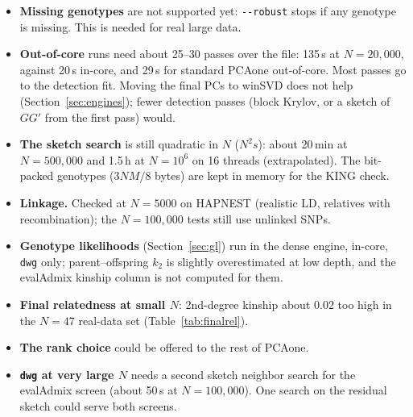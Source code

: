 \documentclass[11pt,a4paper]{article}
\newcommand{\opt}[1]{\texttt{-{}-#1}}
\begin{document}
\begin{itemize}
  \item \textbf{Missing genotypes} are not supported yet: \opt{robust} stops
    if any genotype is missing. This is needed for real large data.
  \item \textbf{Out-of-core} runs need about 25--30 passes over the file:
    135\,s at $N=20{,}000$, against 20\,s in-core, and 29\,s for standard
    PCAone out-of-core. Most passes go to the detection fit. Moving the final
    PCs to winSVD does not help (Section~\ref{sec:engines}); fewer detection
    passes (block Krylov, or a sketch of $GG'$ from the first pass) would.
  \item \textbf{The sketch search} is still quadratic in $N$ ($N^2s$):
    about 20\,min at $N=500{,}000$ and 1.5\,h at $N=10^6$ on 16 threads
    (extrapolated). The bit-packed genotypes ($3NM/8$ bytes) are kept in memory
    for the KING check.
  \item \textbf{Linkage.} Checked at $N=5000$ on HAPNEST (realistic LD,
    relatives with recombination); the $N=100{,}000$ tests still use unlinked
    SNPs.
  \item \textbf{Genotype likelihoods} (Section~\ref{sec:gl}) run in the dense
    engine, in-core, \texttt{dwg} only; parent--offspring $k_2$ is slightly
    overestimated at low depth, and the evalAdmix kinship column is not
    computed for them.
  \item \textbf{Final relatedness at small $N$}: 2nd-degree kinship about
    0.02 too high in the $N=47$ real-data set (Table~\ref{tab:finalrel}).
  \item \textbf{The rank choice} could be offered to the rest of PCAone.
  \item \textbf{\texttt{dwg} at very large $N$} needs a second sketch
    neighbor search for the evalAdmix screen (about 50\,s at $N=100{,}000$).
    One search on the residual sketch could serve both screens.
\end{itemize}
\end{document}
